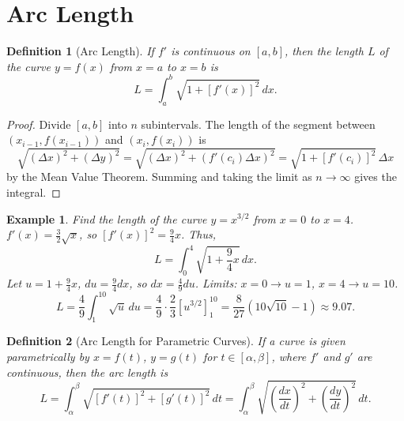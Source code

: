 \documentclass[11pt,a4paper]{article}
\newtheorem{example}{Example}
\newtheorem{definition}{Definition}
\begin{document}
\section{Arc Length}
\begin{definition}[Arc Length]
If $f'$ is continuous on $[a, b]$, then the length $L$ of the curve $y = f(x)$ from $x = a$ to $x = b$ is
\[
L = \int_a^b \sqrt{1 + [f'(x)]^2} \, dx.
\]
\end{definition}
\begin{proof}
Divide $[a, b]$ into $n$ subintervals. The length of the segment between $(x_{i-1}, f(x_{i-1}))$ and $(x_i, f(x_i))$ is
\[
\sqrt{(\Delta x)^2 + (\Delta y)^2} = \sqrt{(\Delta x)^2 + (f'(c_i) \Delta x)^2} = \sqrt{1 + [f'(c_i)]^2} \, \Delta x
\]
by the Mean Value Theorem. Summing and taking the limit as $n \to \infty$ gives the integral.
\end{proof}
\begin{center}
\end{center}
\begin{example}
Find the length of the curve $y = x^{3/2}$ from $x = 0$ to $x = 4$.
$f'(x) = \frac{3}{2}\sqrt{x}$, so $[f'(x)]^2 = \frac{9}{4}x$. Thus,
\[
L = \int_0^4 \sqrt{1 + \frac{9}{4}x} \, dx.
\]
Let $u = 1 + \frac{9}{4}x$, $du = \frac{9}{4} dx$, so $dx = \frac{4}{9} du$. Limits: $x = 0 \to u = 1$, $x = 4 \to u = 10$.
\[
L = \frac{4}{9} \int_1^{10} \sqrt{u} \, du = \frac{4}{9} \cdot \frac{2}{3} [u^{3/2}]_1^{10} = \frac{8}{27} (10\sqrt{10} - 1) \approx 9.07.
\]
\end{example}
\begin{definition}[Arc Length for Parametric Curves]
If a curve is given parametrically by $x = f(t)$, $y = g(t)$ for $t \in [\alpha, \beta]$, where $f'$ and $g'$ are continuous, then the arc length is
\[
L = \int_{\alpha}^{\beta} \sqrt{[f'(t)]^2 + [g'(t)]^2} \, dt = \int_{\alpha}^{\beta} \sqrt{\left( \frac{dx}{dt} \right)^2 + \left( \frac{dy}{dt} \right)^2} \, dt.
\]
\end{definition}
\end{document}

